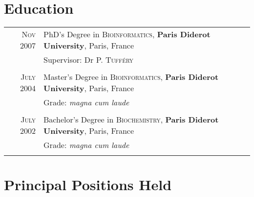 \documentclass[a4paper,10pt]{article}
\begin{document}
\section{Education}
\begin{tabular}{rl}	
  
  \textsc{Nov} 2007 & PhD's Degree in \textsc{Bioinformatics}, \textbf{Paris Diderot University}, Paris, France\\
  & \small Supervisor: Dr P. \textsc{Tufféry}\\
  &\\
  
  \textsc{July} 2004 & Master's Degree in \textsc{Bioinformatics}, \textbf{Paris Diderot University}, Paris, France\\
  & \small Grade: \emph{magna cum laude}\\
  &\\
  
  \textsc{July} 2002 & Bachelor's Degree in \textsc{Biochemistry}, \textbf{Paris Diderot University}, Paris, France\\
  & \small Grade: \emph{magna cum laude}\\
  &\\
\end{tabular}


\section{Principal Positions Held}
\end{document}
